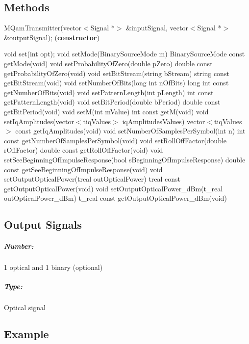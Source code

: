 \pagebreak

\subsection*{Methods}

MQamTransmitter(vector$<$Signal *$>$ \&inputSignal, vector$<$Signal *$>$ \&outputSignal); (\textbf{constructor})
\bigbreak

void set(int opt);
\bigbreak
void setMode(BinarySourceMode m)
\bigbreak
BinarySourceMode const getMode(void)
\bigbreak
void setProbabilityOfZero(double pZero)
\bigbreak
double const getProbabilityOfZero(void)
\bigbreak
void setBitStream(string bStream)
\bigbreak
string const getBitStream(void)
\bigbreak
void setNumberOfBits(long int nOfBits)
\bigbreak
long int const getNumberOfBits(void)
\bigbreak
void setPatternLength(int pLength)
\bigbreak
int const getPatternLength(void)
\bigbreak
void setBitPeriod(double bPeriod)
\bigbreak
double const getBitPeriod(void)
\bigbreak
void setM(int mValue)
int const getM(void)
\bigbreak
void setIqAmplitudes(vector$<$t\textunderscore iqValues$>$ iqAmplitudesValues)
\bigbreak
vector$<$t\textunderscore iqValues$>$ const getIqAmplitudes(void)
\bigbreak
void setNumberOfSamplesPerSymbol(int n)
\bigbreak
int const getNumberOfSamplesPerSymbol(void)
\bigbreak
void setRollOffFactor(double rOffFactor)
\bigbreak
double const getRollOffFactor(void)
\bigbreak
void setSeeBeginningOfImpulseResponse(bool sBeginningOfImpulseResponse)
\bigbreak
double const getSeeBeginningOfImpulseResponse(void)
\bigbreak
void setOutputOpticalPower(t\textunderscore real outOpticalPower)
\bigbreak
t\textunderscore real const getOutputOpticalPower(void)
\bigbreak
void setOutputOpticalPower\_dBm(t\_real outOpticalPower\_dBm)
\bigbreak
t\_real const getOutputOpticalPower\_dBm(void)
\pagebreak

\subsection*{Output Signals}

\subparagraph*{Number:} 1 optical and 1 binary (optional)

\subparagraph*{Type:} Optical signal

\subsection*{Example}

